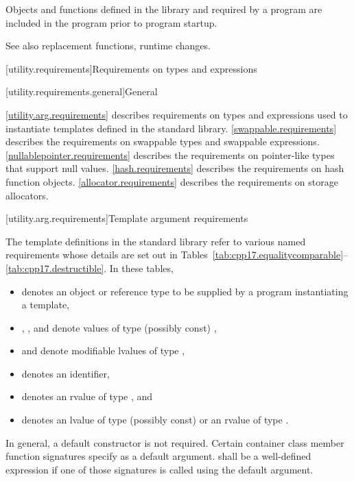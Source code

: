 \pnum
Objects and functions
defined in the library and required by a \Cpp{} program are included in
the program prior to program startup.

%
\pnum
See also
replacement functions,
runtime changes.

[utility.requirements]{Requirements on types and expressions}

[utility.requirements.general]{General}

\pnum
\ref{utility.arg.requirements}
describes requirements on types and expressions used to instantiate templates
defined in the \Cpp{} standard library.
\ref{swappable.requirements} describes the requirements on swappable types and
swappable expressions.
\ref{nullablepointer.requirements} describes the requirements on pointer-like
types that support null values.
\ref{hash.requirements} describes the requirements on hash function objects.
\ref{allocator.requirements} describes the requirements on storage
allocators.

[utility.arg.requirements]{Template argument requirements}

\pnum
The template definitions in the \Cpp{} standard library
refer to various named requirements whose details are set out in
Tables~\ref{tab:cpp17.equalitycomparable}--\ref{tab:cpp17.destructible}.
In these tables,
\begin{itemize}
\item
{} denotes an object or reference type to be
supplied by a \Cpp{} program instantiating a template,
\item
{},
, and
 denote values of type (possibly const) ,
\item
{} and  denote modifiable lvalues of type ,
\item
{} denotes an identifier,
\item
{} denotes an rvalue of type , and
\item
{} denotes an lvalue of type (possibly const)  or an
rvalue of type .
\end{itemize}

\pnum
In general, a default constructor is not required. Certain container class
member function signatures specify  as a default argument.
 shall be a well-defined expression if one of those
signatures is called using the default argument.

